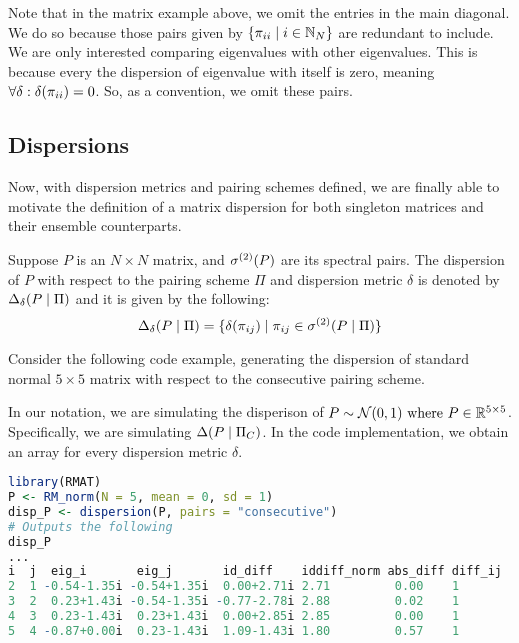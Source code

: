 \begin{remark}
Note that in the matrix example above, we omit the entries in the main diagonal. We do so because those pairs given by $\{\pi_{ii} \mid i \in \mathbb{N}_N\}$
are redundant to include. We are only interested comparing eigenvalues with other eigenvalues. This is because every the dispersion of eigenvalue with itself is zero,
meaning $\forall \delta : \delta(\pi_{ii}) = 0$. So, as a convention, we omit these pairs.
\end{remark}

\subsection{Dispersions}

Now, with dispersion metrics and pairing schemes defined, we are finally able to motivate the definition of a matrix dispersion for both singleton matrices and their ensemble counterparts.

\begin{definition}[Dispersion]
Suppose $P$ is an $N \times N$ matrix, and ${\sigma^{(2)}}(P)$ are its spectral pairs.
The dispersion of $P$ with respect to the pairing scheme $\Pi$ and dispersion metric $\delta$ is denoted by $\Delta_\delta(P \mid \Pi)$ and it is given by the following:
$$\Delta_\delta(P \mid \Pi) = \{\delta({\pi_{ij}}) \mid {\pi_{ij}} \in {\sigma^{(2)}}(P \mid \Pi)\}$$
\end{definition}

Consider the following code example, generating the dispersion of standard normal $5 \times 5$ matrix with respect to the consecutive pairing scheme.

\begin{code}
In our notation, we are simulating the disperison of $P \sim \mathcal{N}(0,1) \text{ where } P \in \mathbb{R}^{5 \times 5}$.
Specifically, we are simulating $\Delta(P \mid \Pi_C)$. In the code implementation, we obtain an array for every dispersion metric $\delta$.
\end{code}
\begin{lstlisting}[language=R]
library(RMAT)
P <- RM_norm(N = 5, mean = 0, sd = 1)
disp_P <- dispersion(P, pairs = "consecutive")
# Outputs the following
disp_P
...
i  j  eig_i       eig_j       id_diff    iddiff_norm abs_diff diff_ij
2  1 -0.54-1.35i -0.54+1.35i  0.00+2.71i 2.71         0.00    1
3  2  0.23+1.43i -0.54-1.35i -0.77-2.78i 2.88         0.02    1
4  3  0.23-1.43i  0.23+1.43i  0.00+2.85i 2.85         0.00    1
5  4 -0.87+0.00i  0.23-1.43i  1.09-1.43i 1.80         0.57    1
\end{lstlisting}


